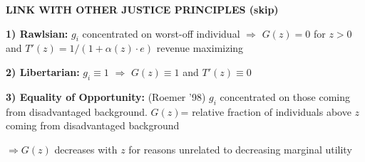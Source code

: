 \documentclass[landscape]{slides}
\begin{document}
\begin{slide}
\begin{center}
{\bf LINK WITH OTHER JUSTICE PRINCIPLES (skip)}
\end{center}

\textbf{1) Rawlsian:}  $g_i$ concentrated on worst-off individual $\Rightarrow$ $G(z)=0$ for $z>0$ and
$T'(z)=1/(1+ \alpha(z) \cdot e)$ revenue maximizing

\textbf{2) Libertarian:} $g_i \equiv 1$ $\Rightarrow$ $G(z)\equiv 1$ and $T'(z) \equiv 0$

%

\textbf{3) Equality of Opportunity:} (Roemer '98) $g_i$ concentrated on those coming from disadvantaged background.
$G(z)$= relative fraction of individuals above $z$ coming from disadvantaged background

$\Rightarrow G(z)$ decreases with $z$ for reasons unrelated to decreasing marginal utility


\end{slide}


\begin{slide}

\end{slide}

%
%
%
%
%
\end{document}
